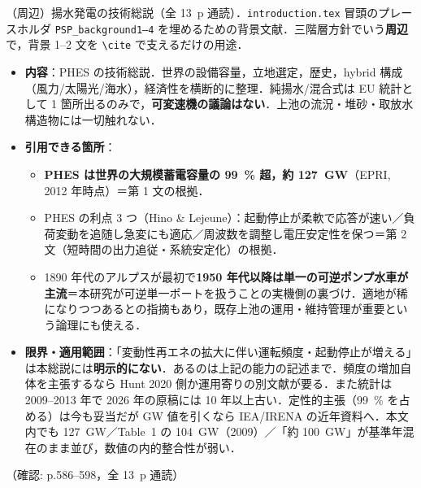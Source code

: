 \documentclass[11pt]{jsarticle}
\newcommand{\litref}[1]{{\large\bfseries\color{citecolor}#1}}
\begin{document}
\noindent\litref{Rehman et al. (2015)}\quad（周辺）揚水発電の技術総説（全 13~p 通読）．\texttt{introduction.tex} 冒頭のプレースホルダ \texttt{PSP\_background1--4} を埋めるための背景文献．三階層方針でいう\textbf{周辺}で，背景 1--2 文を \verb|\cite| で支えるだけの用途．
\begin{itemize}
  \item \textbf{内容}：PHES の技術総説．世界の設備容量，立地選定，歴史，hybrid 構成（風力/太陽光/海水），経済性を横断的に整理．純揚水/混合式は EU 統計として 1 箇所出るのみで，\textbf{可変速機の議論はない}．上池の流況・堆砂・取放水構造物には一切触れない．
  \item \textbf{引用できる箇所}：
  \begin{itemize}
    \item \textbf{PHES は世界の大規模蓄電容量の 99~\% 超，約 127~GW}（EPRI, 2012 年時点）＝第 1 文の根拠．
    \item PHES の利点 3 つ（Hino \& Lejeune）：起動停止が柔軟で応答が速い／負荷変動を追随し急変にも適応／周波数を調整し電圧安定性を保つ＝第 2 文（短時間の出力追従・系統安定化）の根拠．
    \item 1890 年代のアルプスが最初で\textbf{1950 年代以降は単一の可逆ポンプ水車が主流}＝本研究が可逆単一ポートを扱うことの実機側の裏づけ．適地が稀になりつつあるとの指摘もあり，既存上池の運用・維持管理が重要という論理にも使える．
  \end{itemize}
  \item \textbf{限界・適用範囲}：「変動性再エネの拡大に伴い運転頻度・起動停止が増える」は本総説には\textbf{明示的にない}．あるのは上記の能力の記述まで．頻度の増加自体を主張するなら Hunt 2020 側か運用寄りの別文献が要る．また統計は 2009--2013 年で 2026 年の原稿には 10 年以上古い．定性的主張（99~\% を占める）は今も妥当だが GW 値を引くなら IEA/IRENA の近年資料へ．本文内でも 127~GW／Table~1 の 104~GW（2009）／「約 100~GW」が基準年混在のまま並び，数値の内的整合性が弱い．
\end{itemize}
\noindent（確認: p.586--598，全 13~p 通読）
\end{document}
